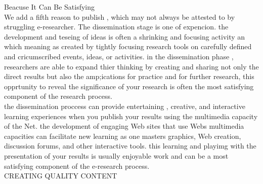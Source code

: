 \documentclass{book}
\begin{document}
Beacuse It Can Be Satisfying\\
We add a fifth reason to publish , which may not always be attested to by struggling
e-researcher. The dissemination stage is one of expencion. the development and teseing 
of ideas is often a shrinking and focusing activity an which meaning as created by
tightly focusing research tools on carefully defined and cricumscribed events, ideas, or
activities. in the dissemination phase , researchers are able to expand thier thinking by
creating and sharing not only the direct results but also  the amp;ications for practice
and for further research, this opprtunity to reveal the significance of your research is 
often the most satisfying component of the research process.\\
the dissemination proccess can provide entertaining , creative, and interactive
learning experiences when you publish your results using the multimedia capacity of the Net.
the development of engaging Web sites that use Webs multimedia capacities can facilitate new learning 
as one masters graphics, Web creation, discussion forums, and other interactive tools.
this learning and playimg with the presentation of  your results is usually enjoyable work and can
be a most satisfying component of the  e-research process.\\


CREATING QUALITY CONTENT\\
\end{document}
